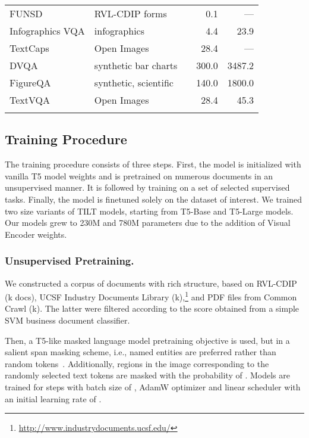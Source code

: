 \documentclass[runningheads]{llncs}
\begin{document}
\begin{table}[ht!]
\begin{tabular}{llcrr}
        FUNSD~\cite{jaume2019} & RVL-CDIP forms &   & 0.1 & --- \\

        Infographics VQA & infographics &   & 4.4 & 23.9 \\

        TextCaps~\cite{sidorov2019textcaps} & Open Images &   & 28.4 & --- \\

        DVQA~\cite{kafle2018dvqa} & synthetic bar charts &   & 300.0 & 3487.2 \\

        FigureQA~\cite{Kahou2018FigureQAAA} & synthetic, scientific &   & 140.0 & 1800.0 \\

        TextVQA~\cite{singh2019towards} & Open Images &   & 28.4 & 45.3 \\
        \bottomrule \\
    \end{tabular}
\end{table}

\subsection{Training Procedure}\label{sec:training_procedure}
The training procedure consists of three steps. First, the model is initialized with vanilla T5 model weights and is pretrained on numerous documents in an unsupervised manner. It is followed by training on a set of selected supervised tasks. Finally, the model is finetuned solely on the dataset of interest. We trained two size variants of TILT models, starting from T5-Base and T5-Large models. Our models grew to 230M and 780M parameters due to the addition of Visual Encoder weights.

\subsubsection{Unsupervised Pretraining.} We constructed a corpus of documents with rich structure, based on RVL-CDIP (k docs), UCSF Industry Documents Library (k),\footnote{\url{http://www.industrydocuments.ucsf.edu/}} and PDF files from Common Crawl (k). The latter were filtered according to the score obtained from a simple SVM business document classifier.

Then, a T5-like masked language model pretraining objective is used, but in a salient span masking scheme, i.e., named entities are preferred rather than random tokens~\cite{2020t5,guu2020realm}.
Additionally, regions in the image corresponding to the randomly selected text tokens are masked with the probability of . Models are trained for  steps with batch size of , AdamW optimizer and linear scheduler with an initial learning rate of .
\end{document}
